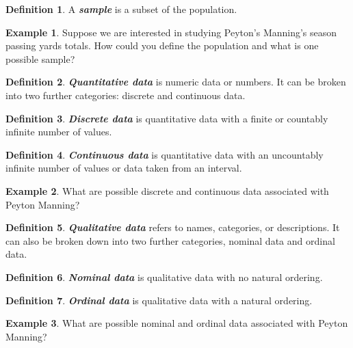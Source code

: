 \documentclass[
]{book}
\theoremstyle{definition}
\newtheorem{definition}{Definition}[chapter]
\theoremstyle{definition}
\newtheorem{example}{Example}[chapter]
\theoremstyle{definition}
\theoremstyle{definition}
\theoremstyle{remark}
\begin{document}
\begin{definition}
A \textbf{\emph{sample}} is a subset of the population.
\end{definition}

\begin{example}
Suppose we are interested in studying Peyton's Manning's season passing yards totals. How could you define the population and what is one possible sample?
\end{example}

\hfill\break
\hfill\break
\hfill\break
\hfill\break
\hfill\break

\begin{definition}
\textbf{\emph{Quantitative data}} is numeric data or numbers. It can be broken into two further categories: discrete and continuous data.
\end{definition}

\begin{definition}
\textbf{\emph{Discrete data}} is quantitative data with a finite or countably infinite number of values.
\end{definition}

\begin{definition}
\textbf{\emph{Continuous data}} is quantitative data with an uncountably infinite number of values or data taken from an interval.
\end{definition}

\begin{example}
What are possible discrete and continuous data associated with Peyton Manning?
\end{example}

\hfill\break
\hfill\break
\hfill\break
\hfill\break
\hfill\break

\begin{definition}
\textbf{\emph{Qualitative data}} refers to names, categories, or descriptions. It can also be broken down into
two further categories, nominal data and ordinal data.
\end{definition}

\begin{definition}
\textbf{\emph{Nominal data}} is qualitative data with no natural ordering.
\end{definition}

\begin{definition}
\textbf{\emph{Ordinal data}} is qualitative data with a natural ordering.
\end{definition}

\begin{example}
What are possible nominal and ordinal data associated with Peyton Manning?
\end{example}
\end{document}
